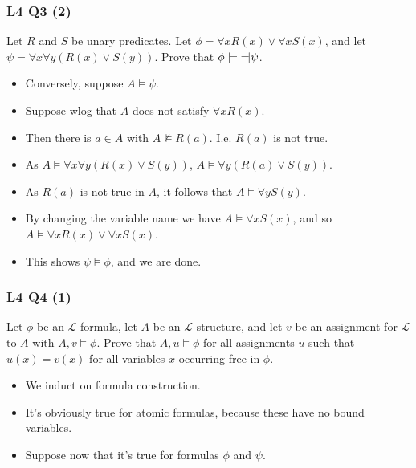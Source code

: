 \documentclass[handout]{beamer}
\newcommand{\sL}{\mathscr{L}}
\newcommand{\lequiv}{\models\text{\reflectbox{$\models$}}}
\begin{document}
\begin{frame}
\frametitle{L4 Q3 (2)}
Let $R$ and $S$ be unary predicates. Let $\phi=\forall x R(x) \vee \forall x S(x)$, and let $\psi=\forall x \forall y (R(x)\vee S(y))$. Prove that $\phi\lequiv \psi$.
\vspace{0.5cm}
\begin{itemize}
\item Conversely, suppose $A\models \psi$. \vspace{0.2cm}
\item Suppose wlog that $A$ does not satisfy $\forall x R(x)$. \vspace{0.2cm}
\item Then there is $a\in A$ with $A\not\models R(a)$. I.e. $R(a)$ is not true. \vspace{0.2cm}
\item As $A\models \forall x\forall y(R(x)\vee S(y))$, \/$A\models \forall y(R(a)\vee S(y))$. \vspace{0.2cm}
\item As $R(a)$ is not true in $A$, it follows that $A\models \forall y S(y)$. \vspace{0.2cm}
\item By changing the variable name we have $A\models \forall x S(x)$, and so $A\models \forall x R(x) \vee \forall x S(x)$. \vspace{0.2cm}
\item This shows $\psi\models \phi$, and we are done.
\end{itemize}
\end{frame}


\begin{frame}
\frametitle{L4 Q4 (1)}
Let $\phi$ be an $\sL$-formula, let $A$ be an $\sL$-structure, and let $v$ be an assignment for $\sL$ to $A$ with $A,v \models \phi$. Prove that $A,u\models \phi$ for all assignments $u$ such that $u(x)= v(x)$ for all variables $x$ occurring free in $\phi$.\vspace{0.5cm}
\vspace{0.5cm}
\begin{itemize}
\item We induct on formula construction. \vspace{0.5cm}
\item It's obviously true for atomic formulas, because these have no bound variables. \vspace{0.5cm}
\item Suppose now that it's true for formulas $\phi$ and $\psi$.
\end{itemize}
\end{frame}
\end{document}

